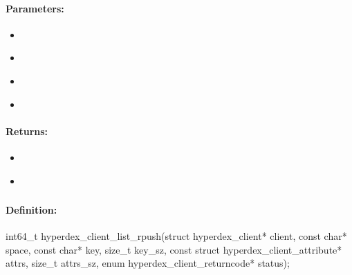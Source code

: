 \paragraph{Parameters:}
\begin{itemize}[noitemsep]
\item {}\\

\item {}\\

\item {}\\

\item {}\\

\end{itemize}

\paragraph{Returns:}
\begin{itemize}[noitemsep]
\item {}\\

\item {}\\

\end{itemize}

\pagebreak
\subsubsection{}
\label{api:c:list_rpush}


\paragraph{Definition:}
\begin{ccode}
int64_t hyperdex_client_list_rpush(struct hyperdex_client* client,
        const char* space,
        const char* key, size_t key_sz,
        const struct hyperdex_client_attribute* attrs, size_t attrs_sz,
        enum hyperdex_client_returncode* status);
\end{ccode}

